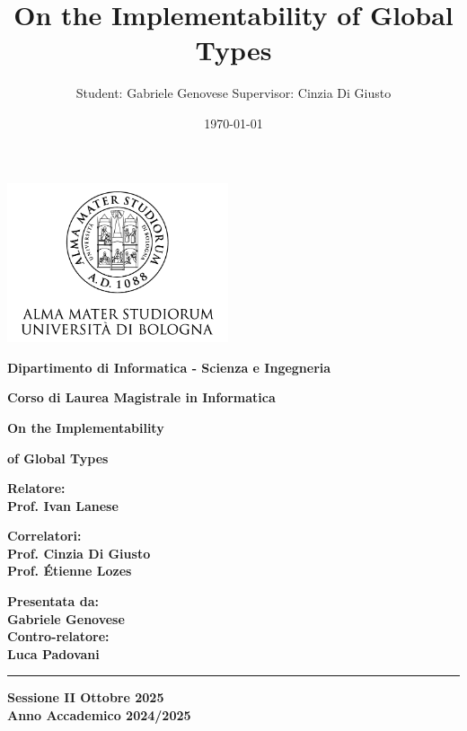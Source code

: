\documentclass[12pt,a4paper,twoside]{book}
\title{On the Implementability of Global Types}
\author{Student: Gabriele Genovese Supervisor: Cinzia Di Giusto}
\date{\today}
\theoremstyle{definition}
\theoremstyle{definition}
\theoremstyle{definition}
\begin{document}
\begin{titlepage}
\begin{center}
    \includegraphics[width=6.5cm,height=4.7cm]{img/unibo.png}
    
    \vspace{10mm}
   
    {\large{\bf{Dipartimento di Informatica - Scienza e Ingegneria}}} 
    
    \vspace{5mm}
    
    {\Large{\bf{Corso di Laurea Magistrale in Informatica}}}
    
    \vspace{15mm}
    
    {\Huge{\bf On the Implementability }}\\
    
    \vspace{3mm}
    
    {\Huge{\bf of Global Types}}\\
   
    \vspace{3mm}
\end{center}

\vspace{10mm}

\begin{minipage}[t]{0.45\textwidth}
    
    {\Large{\bf Relatore: \\ Prof. Ivan Lanese}}
    
    \vspace{3mm}
    
    {\Large{\bf Correlatori:\\Prof. Cinzia Di Giusto\\Prof. Étienne Lozes}}
\end{minipage}
\hfill
\begin{minipage}[t]{0.37\textwidth}\raggedleft
    {\Large{\bf Presentata da: \\ Gabriele Genovese}}\\
    {\Large{\bf Contro-relatore: \\ Luca Padovani}}
\end{minipage}

\vspace{25mm}
\rule[0.5cm]{15.8cm}{0.6mm}

\begin{center}
    {\large{\bf Sessione II Ottobre 2025 \\}}
    {\large{\bf Anno Accademico 2024/2025\\}}
\end{center}

\end{titlepage}
\end{document}

